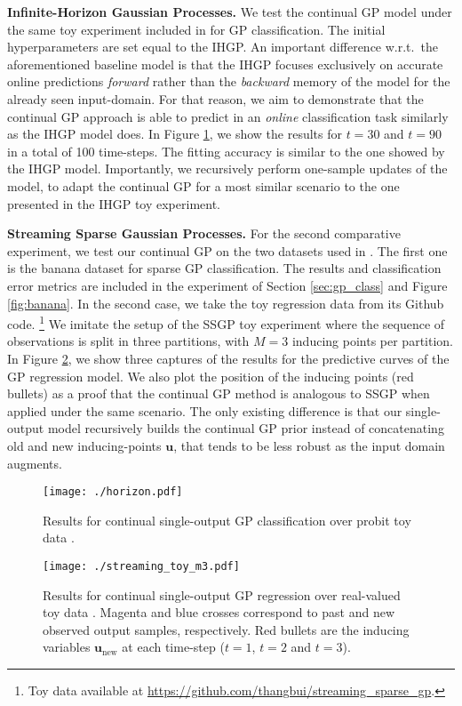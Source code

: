 \documentclass[]{article}
\def\u{{\mathbf u}}
\newcommand{\unew}{{\u_{\text{new}}}}
\begin{document}
\textbf{Infinite-Horizon Gaussian Processes.} We test the continual GP model under the same toy experiment included in \citet{solin2018infinite} for GP classification. The initial hyperparameters are set equal to the IHGP. An important difference w.r.t.\ the aforementioned baseline model is that the IHGP focuses exclusively on accurate online predictions \textit{forward} rather than the \textit{backward} memory of the model for the already seen input-domain. For that reason, we aim to demonstrate that the continual GP approach is able to predict in an \textit{online} classification task similarly as the IHGP model does. In Figure \ref{fig:horizon}, we show the results for $t=30$ and $t=90$ in a total of 100 time-steps. The fitting accuracy is similar to the one showed by the IHGP model. Importantly, we recursively perform one-sample updates of the model, to adapt the continual GP for a most similar scenario to the one presented in the IHGP toy experiment.

\textbf{Streaming Sparse Gaussian Processes.} For the second comparative experiment, we test our continual GP on the two datasets used in \citet{bui2017streaming}. The first one is the banana dataset for sparse GP classification. The results and classification error metrics are included in the experiment of Section \ref{sec:gp_class} and Figure \ref{fig:banana}. In the second case, we take the toy regression data from its Github code. \footnote{Toy data available at \url{https://github.com/thangbui/streaming_sparse_gp}.} We imitate the setup of the SSGP toy experiment where the sequence of observations is split in three partitions, with $M=3$ inducing points per partition. In Figure \ref{fig:streaming_bui}, we show three captures of the results for the predictive curves of the GP regression model. We also plot the position of the inducing points (red bullets) as a proof that the continual GP method is analogous to SSGP when applied under the same scenario. The only existing difference is that our single-output model recursively builds the continual GP prior instead of concatenating old and new inducing-points $\u$, that tends to be less robust as the input domain augments.

\begin{figure}[]
	\centering
	\texttt{[image: ./horizon.pdf]}
	\caption{Results for continual single-output GP classification over probit toy data \citep{solin2018infinite}.}
	\label{fig:horizon}
\end{figure}

\begin{figure}[]
	\centering
	\texttt{[image: ./streaming\_toy\_m3.pdf]}
	\caption{Results for continual single-output GP regression over real-valued toy data \citep{bui2017streaming}. Magenta and blue crosses correspond to past and new observed output samples, respectively. Red bullets are the inducing variables $\unew$ at each time-step ($t=1$, $t=2$ and $t=3$).}
	\label{fig:streaming_bui}
\end{figure}
\end{document}
